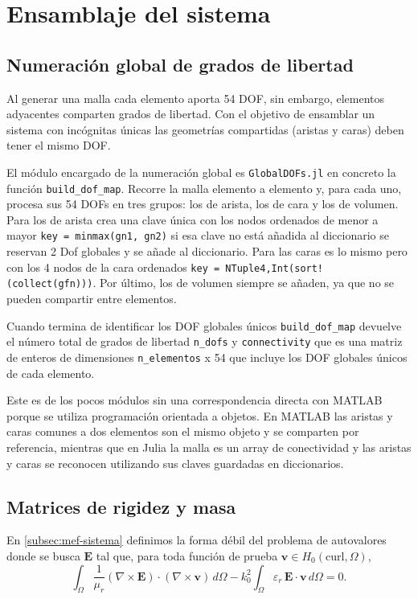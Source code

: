 \documentclass[12pt]{report} %
\begin{document}
\section{Ensamblaje del sistema}\label{sec:ensamblaje}

\subsection{Numeración global de grados de libertad}\label{sec:dofs-globales}

Al generar una malla cada elemento aporta 54 DOF, sin embargo, elementos adyacentes comparten grados de libertad. Con el objetivo de ensamblar un sistema con incógnitas únicas las geometrías compartidas (aristas y caras) deben tener el mismo DOF.

El módulo encargado de la numeración global es \texttt{GlobalDOFs.jl} en concreto la función \texttt{build\_dof\_map}. Recorre la malla elemento a elemento y, para cada uno, procesa sus 54 DOFs en tres grupos: los de arista, los de cara y los de volumen. Para los de arista crea una clave única con los nodos ordenados de menor a mayor \texttt{key = minmax(gn1, gn2)} si esa clave no está añadida al diccionario se reservan 2 Dof globales y se añade al diccionario. Para las caras es lo mismo pero con los 4 nodos de la cara ordenados \texttt{key = NTuple{4,Int}(sort!(collect(gfn)))}. Por último, los de volumen siempre se añaden, ya que no se pueden compartir entre elementos.

Cuando termina de identificar los DOF globales únicos \texttt{build\_dof\_map} devuelve el número total de grados de libertad \texttt{n\_dofs} y \texttt{connectivity} que es una matriz de enteros de dimensiones \texttt{n\_elementos} x 54 que incluye los DOF globales únicos de cada elemento.

Este es de los pocos módulos sin una correspondencia directa con MATLAB porque se utiliza programación orientada a objetos. En MATLAB las aristas y caras comunes a dos elementos son el mismo objeto y se comparten por referencia, mientras que en Julia la malla es un array de conectividad y las aristas y caras se reconocen utilizando sus claves guardadas en diccionarios.

\subsection{Matrices de rigidez y masa}\label{sec:KM}
En \autoref{subsec:mef-sistema} definimos la forma débil del problema de autovalores donde se busca $\mathbf{E}$ tal que, para toda función de prueba $\mathbf{v}\in H_0(\mathrm{curl},\Omega)$,
\begin{equation}\label{eq:forma-debil-KM}
	\int_\Omega \frac{1}{\mu_r}(\nabla\times\mathbf{E})\cdot(\nabla\times\mathbf{v})\,d\Omega
	- k_0^2 \int_\Omega \varepsilon_r\,\mathbf{E}\cdot\mathbf{v}\,d\Omega = 0 .
\end{equation}
\end{document}
